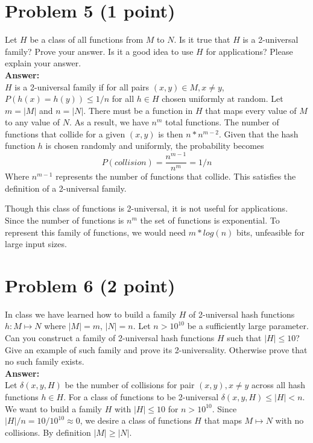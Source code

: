 \documentclass[letterpaper, 11pt]{article}
\begin{document}
\section*{Problem 5 (1 point)}
Let $H$ be a class of all functions from $M$ to $N$. Is it true that $H$ is a 2-universal family? Prove your answer. Is it a good idea to use $H$ for applications? Please explain your answer. \\
\textbf{Answer:} \\
$H$ is a 2-universal family if for all pairs $(x,y) \in M , x \neq y$, $P(h(x) = h(y)) \leq 1/n$ for all $h \in H$  chosen uniformly at random. Let $m = |M|$ and $n=|N|$. There must be a function in $H$ that maps every value of $M$ to any value of $N$. As a result, we have $n^m$ total functions. The number of functions that collide for a given $(x,y)$ is then $n*n^{m-2}$. Given that the hash function $h$ is chosen randomly and uniformly, the probability becomes
$$P(collision)=\frac{n^{m-1}}{n^m}=1/n$$
Where $n^{m-1}$ represents the number of functions that collide. This satisfies the definition of a 2-universal family.

Though this class of functions is 2-universal, it is not useful for applications. Since the number of functions is $n^m$ the set of functions is exponential. To represent this family of functions, we would need $m*log(n)$ bits, unfeasible for large input sizes.
\pagebreak
\section*{Problem 6 (2 point)}
In class we have learned how to build a family $H$ of 2-universal hash functions $h : M \mapsto N$ where $|M| = m$, $|N| = n$. Let $n > 10^{10}$ be a sufficiently large parameter. Can you construct a family of 2-universal hash functions $H$ such that $|H| \leq 10$? Give an example of such family and prove its 2-universality. Otherwise prove that no such family exists. \\
\textbf{Answer:} \\
Let $\delta(x,y,H)$ be the number of collisions for pair $(x,y), x\neq y$ across all hash functions $h \in H$. For a class of functions to be 2-universal $\delta(x,y,H)\leq |H|<n$. We want to build a family $H$ with $|H| \leq 10$ for $n>10^{10}$. Since $|H|/n=10/10^{10} \approx 0$, we desire a class of functions $H$ that maps $M \mapsto N$ with no collisions. By definition $|M| \geq |N|$.
\end{document}
